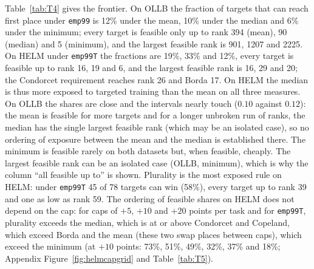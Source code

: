 \documentclass{article}
\begin{document}
Table~\ref{tab:T4} gives the frontier. On OLLB the fraction of targets that can reach first place under \texttt{emp99} is 12\% under the mean, 10\% under the median and 6\% under the minimum; every target is feasible only up to rank 394 (mean), 90 (median) and 5 (minimum), and the largest feasible rank is 901, 1207 and 2225. On HELM under \texttt{emp99T} the fractions are 19\%, 33\% and 12\%, every target is feasible up to rank 16, 19 and 6, and the largest feasible rank is 16, 29 and 20; the Condorcet requirement reaches rank 26 and Borda 17. On HELM the median is thus more exposed to targeted training than the mean on all three measures. On OLLB the shares are close and the intervals nearly touch ($0.10$ against $0.12$): the mean is feasible for more targets and for a longer unbroken run of ranks, the median has the single largest feasible rank (which may be an isolated case), so no ordering of exposure between the mean and the median is established there. The minimum is feasible rarely on both datasets but, when feasible, cheaply. The largest feasible rank can be an isolated case (OLLB, minimum), which is why the column ``all feasible up to'' is shown. Plurality is the most exposed rule on HELM: under \texttt{emp99T} 45 of 78 targets can win (58\%), every target up to rank 39 and one as low as rank 59. The ordering of feasible shares on HELM does not depend on the cap: for caps of $+5$, $+10$ and $+20$ points per task and for \texttt{emp99T}, plurality exceeds the median, which is at or above Condorcet and Copeland, which exceed Borda and the mean (these two swap places between caps), which exceed the minimum (at $+10$ points: 73\%, 51\%, 49\%, 32\%, 37\% and 18\%; Appendix Figure~\ref{fig:helmcapgrid} and Table~\ref{tab:T5}).

\begin{table}[t]
\caption{Feasibility frontier under the primary cap (\texttt{emp99} on OLLB, \texttt{emp99T} on HELM) and the oracle cap (\texttt{ceil}). \emph{share}: fraction of targets for which first place is reachable (Wilson 95\% intervals); $r^*$: largest rank under the mean among feasible targets (may be an isolated case); \emph{all feas.\ up to}: largest $r$ such that every target of rank $\le r$ is feasible; \emph{first bin $<$ 1/2}: first rank bin (bins double from rank 2) in which fewer than half are feasible. $^\dagger$: the 50 best targets under the mean only, not comparable with the score rules' fractions. Generated by \texttt{figures/src/tables.py}.}
\label{tab:T4}
\centering\scriptsize
\resizebox{\linewidth}{!}{}\\[4pt]
\resizebox{\linewidth}{!}{}
\end{table}
\end{document}
